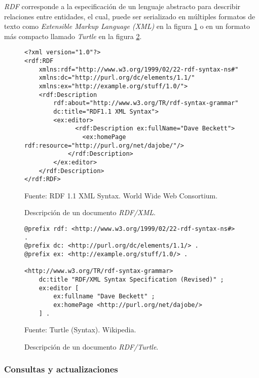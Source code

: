 \textit{RDF} corresponde a la especificación de un lenguaje abstracto para describir relaciones entre entidades, el cual, puede ser serializado en múltiples formatos de texto como \textit{Extensible Markup Language (XML)} \cite{beckett2004rdf} en la figura \ref{fig:rdf-xml-ex} o en un formato más compacto llamado \textit{Turtle} \cite{beckett2014rdf} en la figura \ref{fig:rdf-turtle-ex}.

\begin{figure}
    \begin{lstlisting}[language=CustomXML]
<?xml version="1.0"?>
<rdf:RDF
    xmlns:rdf="http://www.w3.org/1999/02/22-rdf-syntax-ns#"
    xmlns:dc="http://purl.org/dc/elements/1.1/"
    xmlns:ex="http://example.org/stuff/1.0/">
    <rdf:Description
        rdf:about="http://www.w3.org/TR/rdf-syntax-grammar"
        dc:title="RDF1.1 XML Syntax">
        <ex:editor>
              <rdf:Description ex:fullName="Dave Beckett">
                <ex:homePage rdf:resource="http://purl.org/net/dajobe/"/>
            </rdf:Description>
        </ex:editor>
    </rdf:Description>
</rdf:RDF>
    \end{lstlisting}
    \caption{Descripción de un documento \textit{RDF/XML}.} Fuente: RDF 1.1 XML Syntax. World Wide Web Consortium.
    \label{fig:rdf-xml-ex}
\end{figure}

\begin{figure}
    \begin{lstlisting}[language=Turtle]
@prefix rdf: <http://www.w3.org/1999/02/22-rdf-syntax-ns#> .
@prefix dc: <http://purl.org/dc/elements/1.1/> .
@prefix ex: <http://example.org/stuff/1.0/> .

<http://www.w3.org/TR/rdf-syntax-grammar>
    dc:title "RDF/XML Syntax Specification (Revised)" ;
    ex:editor [
        ex:fullname "Dave Beckett" ;
        ex:homePage <http://purl.org/net/dajobe/>
    ] .
    \end{lstlisting}
    \caption{Descripción de un documento \textit{RDF/Turtle}.} Fuente: Turtle (Syntax). Wikipedia.
    \label{fig:rdf-turtle-ex}
\end{figure}

\subsubsection{Consultas y actualizaciones}

